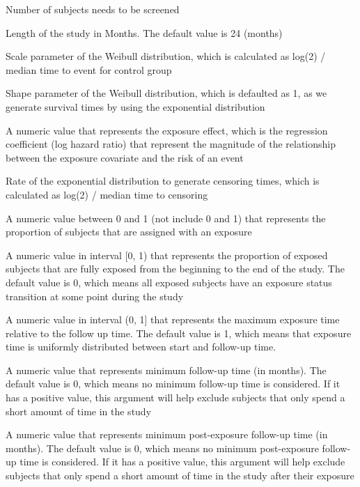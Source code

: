 \documentclass[a4paper]{book}
\begin{document}
%
\begin{Arguments}
\begin{ldescription}
\item[\code{N}] 
Number of subjects needs to be screened

\item[\code{duration}] 
Length of the study in Months. The default value is 24 (months)

\item[\code{lambda}] 
Scale parameter of the Weibull distribution, which is calculated as log(2) / median time to event for control group

\item[\code{rho}] 
Shape parameter of the Weibull distribution, which is defaulted as 1, as we generate survival times by using the exponential distribution

\item[\code{beta}] 
A numeric value that represents the exposure effect, which is the regression coefficient (log hazard ratio) that represent the magnitude of the relationship between the exposure covariate and the risk of an event

\item[\code{rateC}] 
Rate of the exponential distribution to generate censoring times, which is calculated as log(2) / median time to censoring

\item[\code{exp.prop}] 
A numeric value between 0 and 1 (not include 0 and 1) that represents the proportion of subjects that are assigned with an exposure

\item[\code{prop.fullexp}] 
A numeric value in interval [0, 1) that represents the proportion of exposed subjects that are fully exposed from the beginning to the end of the study. The default value is 0, which means all exposed subjects have an exposure status transition at some point during the study

\item[\code{maxrelexptime}] 
A numeric value in interval (0, 1] that represents the maximum exposure time relative to the follow up time. The default value is 1, which means that exposure time is uniformly distributed between start and follow-up time.

\item[\code{min.futime}] 
A numeric value that represents minimum follow-up time (in months). The default value is 0, which means no minimum follow-up time is considered. If it has a positive value, this argument will help exclude subjects that only spend a short amount of time in the study

\item[\code{min.postexp.futime}] 
A numeric value that represents minimum post-exposure follow-up time (in months). The default value is 0, which means no minimum post-exposure follow-up time is considered. If it has a positive value, this argument will help exclude subjects that only spend a short amount of time in the study after their exposure

\end{ldescription}
\end{Arguments}
\end{document}
